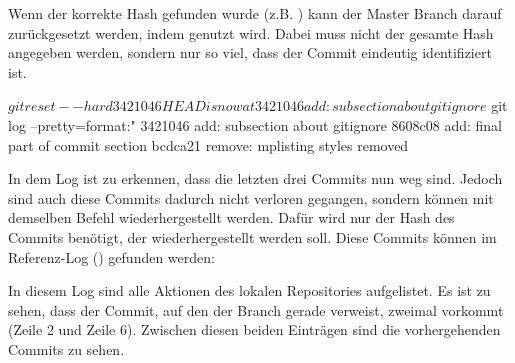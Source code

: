 Wenn der korrekte Hash gefunden wurde (z.B. ) kann der Master Branch darauf zurückgesetzt werden, indem  genutzt wird. Dabei muss nicht der gesamte Hash angegeben werden, sondern nur so viel, dass der Commit eindeutig identifiziert ist.
\begin{mplisting}
$ git reset --hard 3421046
HEAD is now at 3421046 add: subsection about gitignore
$ git log --pretty=format:"%
3421046 add: subsection about gitignore
8608c08 add: final part of commit section
bcdca21 remove: mplisting styles removed
\end{mplisting}
In dem Log ist zu erkennen, dass die letzten drei Commits nun weg sind. Jedoch sind auch diese Commits dadurch nicht verloren gegangen, sondern können mit demselben Befehl wiederhergestellt werden. Dafür wird nur der Hash des Commits benötigt, der wiederhergestellt werden soll. Diese Commits können im Referenz-Log () gefunden werden:
In diesem Log sind alle Aktionen des lokalen Repositories aufgelistet. Es ist zu sehen, dass der Commit, auf den der  Branch gerade verweist, zweimal vorkommt (Zeile 2 und Zeile 6). Zwischen diesen beiden Einträgen sind die vorhergehenden Commits zu sehen.






